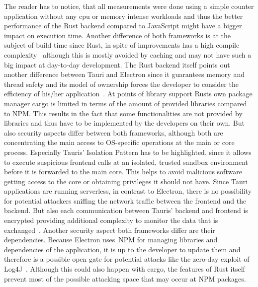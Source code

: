 The reader has to notice, that all measurements were done using a simple counter application without any cpu or memory intense workloads and thus the better performance of the Rust backend compared to JavaScript might have a bigger impact on execution time.
Another difference of both frameworks is at the subject of build time since Rust, in spite of improvements has a high compile complexity~\cite{rustCompileTime} although this is mostly avoided by caching and may not have such a big impact
at day-to-day development.
The Rust backend itself points out another difference between Tauri and Electron since it guarantees memory and thread safety and its model of ownership forces the developer to consider the efficiency of his/her application~\cite{klabnik2019rust}.
At points of library support Rusts own package manager cargo is limited in terms of the amount of provided libraries compared to \ac{NPM}.
This results in the fact that some functionalities are not provided by libraries and thus have to be implemented by the developers on their own.
But also security aspects differ between both frameworks, although both are concentrating the main access to \ac{OS}-specific operations at the main or core process.
Especially Tauris' Isolation Pattern has to be highlighted, since it allows to execute suspicious frontend calls at an isolated, trusted sandbox environment before it is forwarded to the main core.
This helps to avoid malicious software getting access to the core or obtaining privileges it should not have.
Since Tauri applications are running serverless, in contrast to Electron, there is no possibility for potential attackers sniffing the network traffic between the frontend and the backend.
But also each communication between Tauris' backend and frontend is encrypted providing additional complexity to monitor the data that is exchanged~\cite{tauri}.
Another security aspect both frameworks differ are their dependencies.
Because Electron uses~\ac{NPM} for managing libraries and dependencies of the application, it is up to the developer to update them and therefore is a possible open gate for potential attacks like the zero-day exploit of Log4J~\cite{bsi}.
Although this could also happen with cargo, the features of Rust itself prevent most of the possible attacking space that may occur at \ac{NPM} packages.



